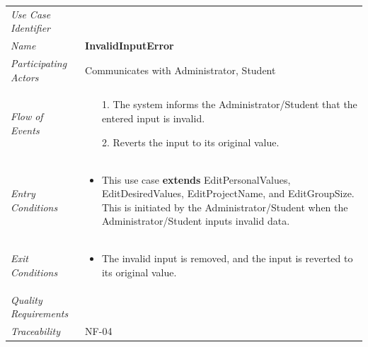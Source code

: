 \documentclass[12pt,letterpaper]{article}
\begin{document}
\begin{center}
	\begin{tabu} to 
		\toprule
		Use Case Identifier & \invalidinputerror{} \\
		Name & {\bf InvalidInputError} \\
		Participating Actors & Communicates with Administrator, Student \\
		Flow of Events & 
		\begin{minipage}[t]{\linewidth}
		    \begin{enumerate}
			    \item[1.] The system informs the Administrator/Student that the entered input is invalid.
			    \item[2.] Reverts the input to its original value.
			\end{enumerate}
		\end{minipage} \\

		Entry Conditions &
		\begin{minipage}[t]{\linewidth}
			\begin{itemize}
			    \item This use case \textbf{extends} EditPersonalValues, EditDesiredValues, EditProjectName, and EditGroupSize. This is initiated by the Administrator/Student when the Administrator/Student inputs invalid data. 
	        \end{itemize}
		\end{minipage} \\

		Exit Conditions &
		\begin{minipage}[t]{\linewidth}
			\begin{itemize}
			    \item The invalid input is removed, and the input is reverted to its original value.
	        \end{itemize}
		\end{minipage} \\

		Quality Requirements & \\

		Traceability & NF-04 \\
		\toprule
	\end{tabu}
\end{center}
\end{document}
